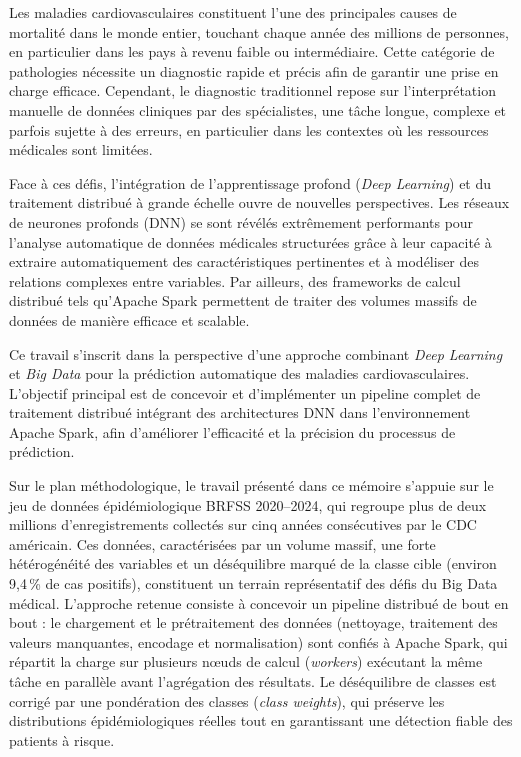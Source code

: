 \documentclass[12pt,a4paper]{report}
\begin{document}
Les maladies cardiovasculaires constituent l'une des principales causes
de mortalité dans le monde entier, touchant chaque année des millions de personnes,
en particulier dans les pays à revenu faible ou intermédiaire. Cette catégorie de
pathologies nécessite un diagnostic rapide et précis afin de garantir une prise en
charge efficace. Cependant, le diagnostic traditionnel repose sur l'interprétation
manuelle de données cliniques par des spécialistes, une tâche longue, complexe et
parfois sujette à des erreurs, en particulier dans les contextes où les ressources
médicales sont limitées.

Face à ces défis, l'intégration de l'apprentissage profond (\textit{Deep Learning})
et du traitement distribué à grande échelle ouvre de nouvelles perspectives. Les
réseaux de neurones profonds (\acs{DNN}) se sont révélés extrêmement performants
pour l'analyse automatique de données médicales structurées grâce à leur capacité
à extraire automatiquement des caractéristiques pertinentes et à modéliser des
relations complexes entre variables. Par ailleurs, des frameworks de calcul distribué
tels qu'Apache Spark permettent de traiter des volumes massifs de données de manière
efficace et scalable.

Ce travail s'inscrit dans la perspective d'une approche combinant \textit{Deep
Learning} et \textit{Big Data} pour la prédiction automatique des maladies
cardiovasculaires. L'objectif principal est de concevoir et d'implémenter un pipeline
complet de traitement distribué intégrant des architectures \acs{DNN} dans
l'environnement Apache Spark, afin d'améliorer l'efficacité et la précision du
processus de prédiction.

Sur le plan méthodologique, le travail présenté dans ce mémoire s'appuie sur le
jeu de données épidémiologique \acs{BRFSS} 2020--2024, qui regroupe plus de deux
millions d'enregistrements collectés sur cinq années consécutives par le \acs{CDC}
américain. Ces données, caractérisées par un volume massif, une forte hétérogénéité
des variables et un déséquilibre marqué de la classe cible (environ 9,4\,\% de cas
positifs), constituent un terrain représentatif des défis du Big Data médical.
L'approche retenue consiste à concevoir un pipeline distribué de bout en bout :
le chargement et le prétraitement des données (nettoyage, traitement des valeurs
manquantes, encodage et normalisation) sont confiés à Apache Spark, qui répartit
la charge sur plusieurs nœuds de calcul (\textit{workers}) exécutant la même tâche
en parallèle avant l'agrégation des résultats. Le déséquilibre de classes est
corrigé par une pondération des classes (\textit{class weights}), qui préserve les
distributions épidémiologiques réelles tout en garantissant une détection fiable des
patients à risque.
\end{document}
